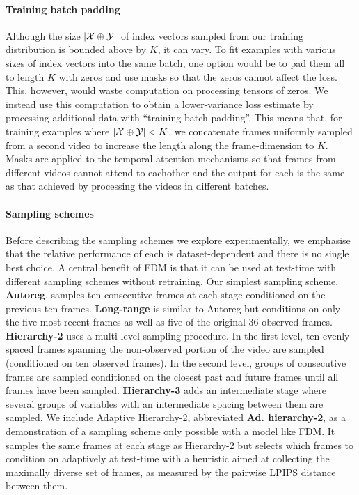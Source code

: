\paragraph{Training batch padding}
Although the size $|\mathcal{X}\oplus\mathcal{Y}|$ of index vectors sampled from our training distribution is bounded above by $K$, it can vary. To fit examples with various sizes of index vectors into the same batch, one option would be to pad them all to length $K$ with zeros and use masks so that the zeros cannot affect the loss. This, however, would waste computation on processing tensors of zeros.
%
We instead use this computation to obtain a lower-variance loss estimate by processing additional data with ``training batch padding''.
%
This means that, for training examples where $|\mathcal{X}\oplus\mathcal{Y}| < K$, we concatenate frames uniformly sampled from a second video to increase the length along the frame-dimension to $K$. Masks are applied to the temporal attention mechanisms so that frames from different videos cannot attend to eachother and the output for each is the same as that achieved by processing the videos in different batches.

\paragraph{Sampling schemes}
Before describing the sampling schemes we explore experimentally, we emphasise that the relative performance of each is dataset-dependent and there is no single best choice. A central benefit of FDM is that it can be used at test-time with different sampling schemes without retraining. Our simplest sampling scheme, \textbf{Autoreg}, samples ten consecutive frames at each stage conditioned on the previous ten frames. \textbf{Long-range} is similar to Autoreg but conditions on only the five most recent frames as well as five of the original 36 observed frames. \textbf{Hierarchy-2} uses a multi-level sampling procedure. In the first level, ten evenly spaced frames spanning the non-observed portion of the video are sampled (conditioned on ten observed frames). In the second level, groups of consecutive frames are sampled conditioned on the closest past and future frames until all frames have been sampled. \textbf{Hierarchy-3} adds an intermediate stage where several groups of variables with an intermediate spacing between them are sampled. We include Adaptive Hierarchy-2, abbreviated \textbf{Ad. hierarchy-2}, as a demonstration of a sampling scheme only possible with a model like FDM. It samples the same frames at each stage as Hierarchy-2 but selects which frames to condition on adaptively at test-time with a heuristic aimed at collecting the maximally diverse set of frames, as measured by the pairwise LPIPS distance~\cite{zhang2018unreasonable} between them.

